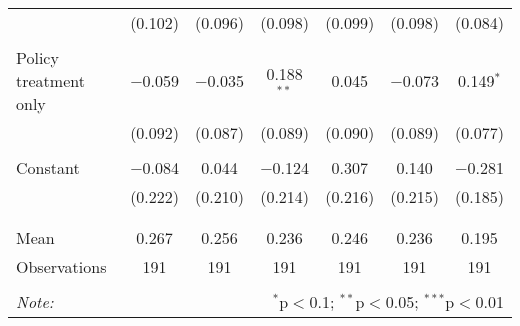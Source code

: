 \begin{tabular}{@{\extracolsep{5pt}}lcccccc}
  & (0.102) & (0.096) & (0.098) & (0.099) & (0.098) & (0.084) \\ 
  & & & & & & \\ 
 Policy treatment only & $-$0.059 & $-$0.035 & 0.188$^{**}$ & 0.045 & $-$0.073 & 0.149$^{*}$ \\ 
  & (0.092) & (0.087) & (0.089) & (0.090) & (0.089) & (0.077) \\ 
  & & & & & & \\ 
 Constant & $-$0.084 & 0.044 & $-$0.124 & 0.307 & 0.140 & $-$0.281 \\ 
  & (0.222) & (0.210) & (0.214) & (0.216) & (0.215) & (0.185) \\ 
  & & & & & & \\ 
\hline \\[-1.8ex] 
Mean & 0.267 & 0.256 & 0.236 & 0.246 & 0.236 & 0.195 \\ 
Observations & 191 & 191 & 191 & 191 & 191 & 191 \\ 
\hline 
\hline \\[-1.8ex] 
\textit{Note:}  & \multicolumn{6}{r}{$^{*}$p$<$0.1; $^{**}$p$<$0.05; $^{***}$p$<$0.01} \\ 
\end{tabular} 
